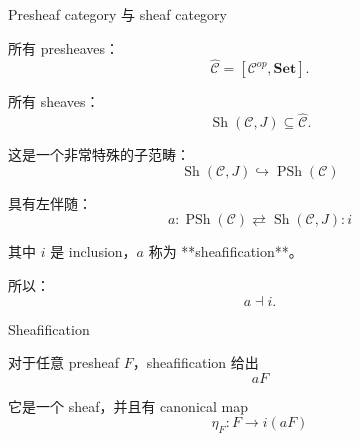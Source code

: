 \documentclass{beamer}
\begin{document}
\begin{frame}[fragile]{Presheaf category 与 sheaf category}
\begin{markdown}
所有 presheaves：
$$
\widehat{\mathcal C} = [\mathcal C^{op},\mathbf{Set}].
$$

所有 sheaves：
$$
\operatorname{Sh}(\mathcal C,J) \subseteq \widehat{\mathcal C}.
$$

这是一个非常特殊的子范畴：
$$
\boxed{\operatorname{Sh}(\mathcal C,J) \hookrightarrow \operatorname{PSh}(\mathcal C)}
$$

具有左伴随：
$$
a:\operatorname{PSh}(\mathcal C)\rightleftarrows\operatorname{Sh}(\mathcal C,J):i
$$

其中 $i$ 是 inclusion，$a$ 称为 **sheafification**。

所以：
$$
a\dashv i.
$$
\end{markdown}
\end{frame}

\begin{frame}[fragile]{Sheafification}
\begin{markdown}
对于任意 presheaf $F$，sheafification 给出
$$
aF
$$

它是一个 sheaf，并且有 canonical map
$$
\eta_F:F\to i(aF)
$$
\end{markdown}
\end{frame}
\end{document}
